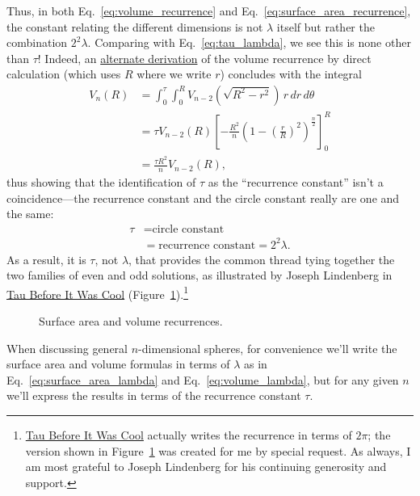 {Thus, in both Eq.~\eqref{eq:volume_recurrence} and Eq.~\eqref{eq:surface_area_recurrence}, the constant relating the different dimensions is not $\lambda$ itself but rather the combination $2^2\lambda$. Comparing with Eq.~\eqref{eq:tau_lambda}, we see this is none other than $\tau$! Indeed, an \href{https://en.wikipedia.org/wiki/Volume_of_an_n-ball#The_two-dimension_recursion_formula}{alternate derivation} of the volume recurrence by direct calculation (which uses $R$ where we write $r$) concludes with the integral
\begin{equation}
\label{eq:integral_recurrence}
\begin{split}
V_n(R) & = \int_0^\tau \int_0^R V_{n-2}\left(\sqrt{R^2 - r^2}\right) \,r\,dr\,d\theta \\
       & = \tau V_{n-2}(R) \left[-\frac{R^2}{n}\left(1 - \left(\frac{r}{R}\right)^2\right)^\frac{n}{2}\right]_{0}^{R} \\
       & = \frac{\tau R^2}{n} V_{n-2}(R),
\end{split}
\end{equation}
thus showing that the identification of $\tau$ as the ``recurrence constant'' isn't a coincidence---the recurrence constant and the circle constant really are one and the same:
\[
\begin{split}
\tau & = \mbox{circle constant} \\
     & = \mbox{recurrence constant} = 2^2\lambda.
\end{split}
\]
As a result, it is $\tau$, not $\lambda$, that provides the common thread tying together the two families of even and odd solutions, as illustrated by Joseph Lindenberg in \href{http://sites.google.com/site/taubeforeitwascool/}{Tau Before It Was Cool} (Figure~\ref{fig:Nspheres}).\footnote{\href{http://sites.google.com/site/taubeforeitwascool/}{Tau Before It Was Cool} actually writes the recurrence in terms of $2\pi$; the version shown in Figure~\ref{fig:Nspheres} was created for me by special request. As always, I am most grateful to Joseph Lindenberg for his continuing generosity and support.}

\begin{figure}
\begin{center}
\end{center}
\caption{Surface area and volume recurrences.\label{fig:Nspheres}}
\end{figure}

When discussing general $n$-dimensional spheres, for convenience \linebreak we'll write the surface area and volume formulas in terms of $\lambda$ as in Eq.~\eqref{eq:surface_area_lambda} and Eq.~\eqref{eq:volume_lambda}, but for any given $n$ we'll express the results in terms of the recurrence constant $\tau$.

}
